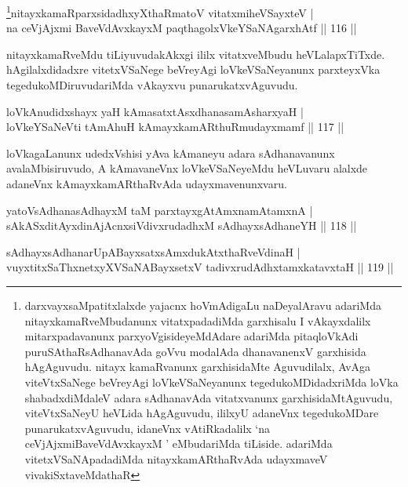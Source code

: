 \begin{shl}
\footnote{darxvayxsaMpatitxlalxde yajacnx hoVmAdigaLu naDeyalAravu adariMda nitayxkamaRveMbudanunx vitatxpadadiMda garxhisalu I vAkayxdalilx mitarxpadavanunx parxyoVgisideyeMdAdare adariMda pitaqloVkAdi puruSAthaRsAdhanavAda goVvu modalAda dhanavanenxV garxhisida hAgAguvudu. nitayx kamaRvanunx garxhisidaMte Aguvudilalx, AvAga viteVtxSaNege beVreyAgi loVkeVSaNeyanunx tegedukoMDidadxriMda loVka shabadxdiMdaleV adara sAdhanavAda vitatxvanunx garxhisidaMtAguvudu, viteVtxSaNeyU heVLida hAgAguvudu, ililxyU adaneVnx tegedukoMDare punarukatxvAguvudu, idaneVnx vAtiRkadalilx `na ceVjAjxmiBaveVdAvxkayxM ' eMbudariMda tiLiside. adariMda vitetxVSaNApadadiMda nitayxkamARthaRvAda udayxmaveV vivakiSxtaveMdathaR}nitayxkamaRparxsidadhxyXthaRmatoV vitatxmiheVSayxteV |\\
na ceVjAjxmi BaveVdAvxkayxM paqthagolxVkeYSaNAgarxhAtf \hfill || 116 ||
\end{shl}

\begin{artha}
nitayxkamaRveMdu tiLiyuvudakAkxgi ililx vitatxveMbudu heVLalapxTiTxde. hAgilalxdidadxre vitetxVSaNege beVreyAgi loVkeVSaNeyanunx parxteyxVka tegedukoMDiruvudariMda vAkayxvu punarukatxvAguvudu.
\end{artha}

\begin{shl}
loVkAnudidxshayx yaH kAmasatxtAsxdhanasamAsharxyaH |\\
loVkeYSaNeVti tAmAhuH kAmayxkamARthuRmudayxmamf \hfill || 117 ||
\end{shl}

\begin{artha}%
loVkagaLanunx udedxVshisi yAva kAmaneyu adara sAdhanavanunx avalaMbisiruvudo, A kAmavaneVnx loVkeVSaNeyeMdu heVLuvaru alalxde adaneVnx kAmayxkamARthaRvAda udayxmavenunxvaru.
\end{artha}

\begin{shl}
yatoV\s sAdhanasAdhayxM taM parxtayxgAtAmxnamAtamxnA |\\
sAkASxditAyxdinA\s jAcnxsiVdivxrudadhxM sAdhayxsAdhaneYH \hfill || 118 ||
\end{shl}

\begin{shl}
sAdhayxsAdhanarUpABayxsatxsAmxdukAtxthaRveVdinaH |\\
vuyxtitxSaThxnetxyXVSaNABayxsetxV tadivxrudAdhxtamxkatavxtaH \hfill || 119 ||
\end{shl}


